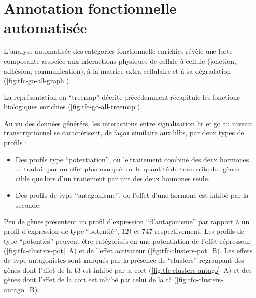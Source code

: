 \documentclass[../main.tex]{subfiles}
\begin{document}


\section{Annotation fonctionnelle automatisée}

	L'analyse automatisée des catégories fonctionnelle enrichies révèle une forte composante associée aux interactions physiques de cellule à cellule (jonction, adhésion, communication), à la matrice extra-cellulaire et à sa dégradation (\autoref{fig:tfc-go-all-graph}).

	

	La représentation en ``treemap'' décrite précédemment récapitule les fonctions biologiques enrichies (\autoref{fig:tfc-go-all-treemap}).

	

	Au vu des données générées, les interactions entre signalisation \gls{ht} et \gls{gc} au niveau transcriptionnel se caractérisent, de façon similaire aux \glspl{hlb}, par deux types de profils :
	\begin{itemize}
		\item
			Des profils type ``potentiation'', où le traitement combiné des deux hormones se traduit par un effet plus marqué sur la quantité de transcrits des gènes cible que lors d'un traitement par une des deux hormones seule.
		\item
			Des profils de type ``antagonisme'', où l'effet d'une hormone est inhibé par la seconde.
	\end{itemize}
	\par
	Peu de gènes présentent un profil d'expression ``d'antagonisme'' par rapport à un profil d'expression de type ``potentié'', 129 et 747 respectivement.
	Les profils de type ``potentiés'' peuvent être catégorisés en une potentiation de l'effet répresseur (\autoref{fig:tfc-clusters-pot}~A) et de l'effet activateur (\autoref{fig:tfc-clusters-pot}~B).
	Les effets de type antagonistes sont marqués par la présence de ``clusters'' regroupant des gènes dont l'effet de la \gls{t3} est inhibé par la \gls{cort} (\autoref{fig:tfc-clusters-antago}~A) et des gènes dont l'effet de la \gls{cort} est inhibé par celui de la \gls{t3} (\autoref{fig:tfc-clusters-antago}~B).

	
\end{document}
